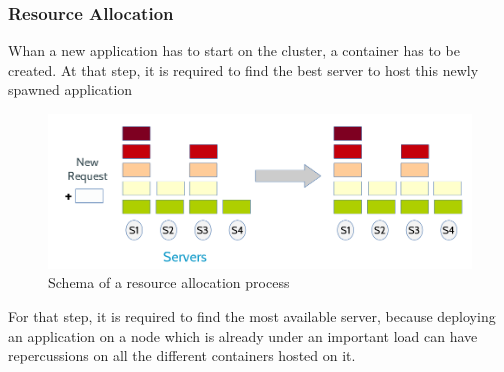 \subsubsection{Resource Allocation}

Whan a new application has to start on the cluster, a container has to be
created.  At that step, it is required to find the best server to host this
newly spawned application

\begin{figure}[h!]
	\includegraphics[width=\textwidth]{./Images/resourceallocation.png}
	\caption{Schema of a resource allocation process}
\end{figure}

For that step, it is required to find the most available server, because
deploying an application on a node which is already under an important load can
have repercussions on all the different containers hosted on it.
